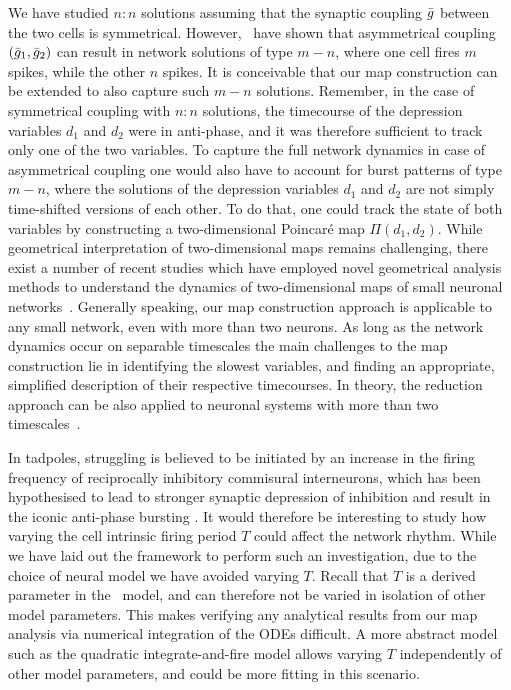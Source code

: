 We have studied $n:n$ solutions assuming that the synaptic coupling $\bar g $ between the two cells is symmetrical. However,~\citet{bose2011} have shown that asymmetrical coupling $(\bar g_1, \bar g_2)$ can result in network solutions of type $m-n$, where one cell fires $m$ spikes, while the other $n$ spikes. It is conceivable that our map construction can be extended to also capture such $m-n$ solutions. Remember, in the case of symmetrical coupling with $n:n$ solutions, the timecourse of the depression variables $d_{1}$ and $d_{2}$ were in anti-phase, and it was therefore sufficient to track only one of the two variables. To capture the full network dynamics in case of asymmetrical coupling one would also have to account for burst patterns of type $m-n$, where the solutions of the depression variables $d_1$ and $d_2$ are not simply time-shifted versions of each other. To do that, one could track the state of both variables by constructing a two-dimensional Poincaré map $\Pi(d_1,d_2)$. While geometrical interpretation of two-dimensional maps remains challenging, there exist a number of recent studies which have employed novel geometrical analysis methods to understand the dynamics of two-dimensional maps of small neuronal networks~\citep{akcay2014,akcay2018,liao2020}. Generally speaking, our map construction approach is applicable to any small network, even with more than two neurons. As long as the network dynamics occur on separable timescales the main challenges to the map construction lie in identifying the slowest variables, and finding an appropriate, simplified description of their respective timecourses. In theory, the reduction approach can be also applied to neuronal systems with more than two timescales~\citep[e.g. see][]{kuehn2015}.

In tadpoles, struggling is believed to be initiated by an increase in the firing frequency of reciprocally inhibitory commisural interneurons, which has been hypothesised to lead to stronger synaptic depression of inhibition and result in the iconic anti-phase bursting \citep{li2007}. It would therefore be interesting to study how varying the cell intrinsic firing period $T$ could affect the network rhythm. While we have laid out the framework to perform such an investigation, due to the choice of neural model we have avoided varying $T$. Recall that $T$ is a derived parameter in the~\citet{morris1981} model, and can therefore not be varied in isolation of other model parameters. This makes verifying any analytical results from our map analysis via numerical integration of the ODEs difficult. A more abstract model such as the quadratic integrate-and-fire model \citep{izhikevich2004} allows varying $T$ independently of other model parameters, and could be more fitting in this scenario.

